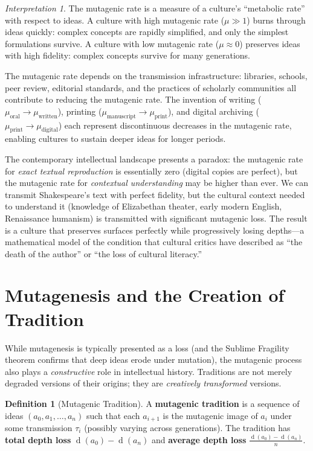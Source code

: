 \documentclass[11pt,openany]{book}
\theoremstyle{definition}
\newtheorem{definition}[axiom]{Definition}
\theoremstyle{plain}
\theoremstyle{remark}
\newtheorem{interpretation}[axiom]{Interpretation}
\newcommand{\depth}{\operatorname{d}}       %
\newcommand{\transmit}{\tau}                 %
\begin{document}
\begin{interpretation}
The mutagenic rate is a measure of a culture's ``metabolic rate'' with respect to ideas. A culture with high mutagenic rate ($\mu \gg 1$) burns through ideas quickly: complex concepts are rapidly simplified, and only the simplest formulations survive. A culture with low mutagenic rate ($\mu \approx 0$) preserves ideas with high fidelity: complex concepts survive for many generations.

The mutagenic rate depends on the transmission infrastructure: libraries, schools, peer review, editorial standards, and the practices of scholarly communities all contribute to reducing the mutagenic rate. The invention of writing ($\mu_{\text{oral}} \to \mu_{\text{written}}$), printing ($\mu_{\text{manuscript}} \to \mu_{\text{print}}$), and digital archiving ($\mu_{\text{print}} \to \mu_{\text{digital}}$) each represent discontinuous decreases in the mutagenic rate, enabling cultures to sustain deeper ideas for longer periods.

The contemporary intellectual landscape presents a paradox: the mutagenic rate for \emph{exact textual reproduction} is essentially zero (digital copies are perfect), but the mutagenic rate for \emph{contextual understanding} may be higher than ever. We can transmit Shakespeare's text with perfect fidelity, but the cultural context needed to understand it (knowledge of Elizabethan theater, early modern English, Renaissance humanism) is transmitted with significant mutagenic loss. The result is a culture that preserves surfaces perfectly while progressively losing depths---a mathematical model of the condition that cultural critics have described as ``the death of the author'' or ``the loss of cultural literacy.''
\end{interpretation}

\section{Mutagenesis and the Creation of Tradition}

While mutagenesis is typically presented as a loss (and the Sublime Fragility theorem confirms that deep ideas erode under mutation), the mutagenic process also plays a \emph{constructive} role in intellectual history. Traditions are not merely degraded versions of their origins; they are \emph{creatively transformed} versions.

\begin{definition}[Mutagenic Tradition]
A \textbf{mutagenic tradition} is a sequence of ideas $(a_0, a_1, \ldots, a_n)$ such that each $a_{i+1}$ is the mutagenic image of $a_i$ under some transmission $\transmit_i$ (possibly varying across generations). The tradition has \textbf{total depth loss} $\depth(a_0) - \depth(a_n)$ and \textbf{average depth loss} $\frac{\depth(a_0) - \depth(a_n)}{n}$.
\end{definition}
\end{document}
